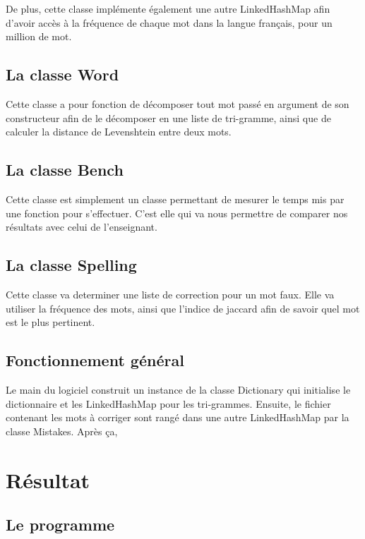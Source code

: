 \documentclass[french,12pt,a4]{report}
\begin{document}
De plus, cette classe implémente également une autre LinkedHashMap afin d'avoir accès à la fréquence de chaque mot dans la langue français, pour un million de mot. 

\section{La classe Word}

Cette classe a pour fonction de décomposer tout mot passé en argument
de son constructeur afin de le décomposer en une liste de tri-gramme,
ainsi que de calculer la distance de Levenshtein entre deux mots.

\section{La classe Bench}

Cette classe est simplement un classe permettant de mesurer le temps
mis par une fonction pour s'effectuer. C'est elle qui va nous
permettre de comparer nos résultats avec celui de l'enseignant.\\

\section{La classe Spelling}

Cette classe va determiner une liste de correction pour un mot
faux. Elle va utiliser la fréquence des mots, ainsi que l'indice de
jaccard afin de savoir quel mot est le plus pertinent.

\section{Fonctionnement général}


Le main du logiciel construit un instance de la classe Dictionary qui
initialise le dictionnaire et les LinkedHashMap pour les
tri-grammes. Ensuite, le fichier contenant les mots à corriger sont
rangé dans une autre LinkedHashMap par la classe Mistakes. 
Après ça, 

\chapter{Résultat}

\section{Le programme}
\end{document}
